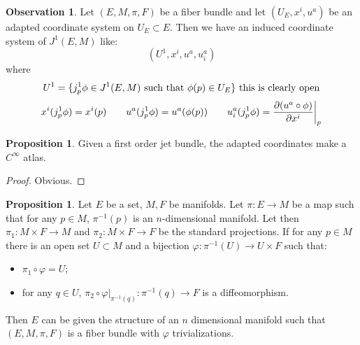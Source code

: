 \documentclass[12pt,a4paper]{report}
\theoremstyle{definition}
\theoremstyle{Theorem}
\newtheorem{Prop}[Def]{Proposition}
\theoremstyle{definition}
\theoremstyle{definition}
\newtheorem{Obs}[Def]{Observation}
\begin{document}
	\begin{Obs}
		Let $(E,M,\pi,F)$ be a fiber bundle and let $(U_E,x^i,u^a)$ be an adapted coordinate system on $U_E\subset E$. Then we have an induced coordinate system of $J^1(E,M)$ like:
		$$(U^1,x^i,u^a,u^a_i)$$
		where
		$$U^1=\{j^1_p\phi\in J^1(E,M)\hbox{ such that }\phi(p)\in U_E\} \hbox{ this is clearly open}$$
		$$x^i(j^1_p\phi)=x^i(p)\hspace{20 pt}u^a(j^1_p\phi)=u^a(\phi(p))\hspace{20 pt}u^a_i(j^1_p\phi)={\partial (u^a\circ \phi)\over \partial x^i}\bigg|_p$$
	\end{Obs}
	\begin{Prop}
		Given a first order jet bundle, the adapted coordinates make a $C^\infty$ atlas.
	\end{Prop}
	\begin{proof}
		Obvious.
	\end{proof}
	\begin{Prop}
		Let $E$ be a set, $M,F$ be manifolds. Let $\pi:E\rightarrow M$ be a map such that for any $p\in M$, $\pi^{-1}(p)$ is an $n$-dimensional manifold. Let then $\pi_1:M\times F\rightarrow M$ and $\pi_2:M\times F\rightarrow F$ be the standard projections. If for any $p\in M$ there is an open set $U\subset M$ and a bijection $\varphi:\pi^{-1}(U)\rightarrow U\times F$ such that:
		\begin{itemize}
			\item $\pi_1\circ \varphi=U$;
			\item for any $q\in U$, $\pi_2\circ \varphi|_{\pi^{-1}(q)}:\pi^{-1}(q)\rightarrow F$ is a diffeomorphism.
		\end{itemize}
		Then $E$ can be given the structure of an $n$ dimensional manifold such that $(E,M,\pi,F)$ is a fiber bundle with $\varphi$ trivializations.
	\end{Prop}
\end{document}
